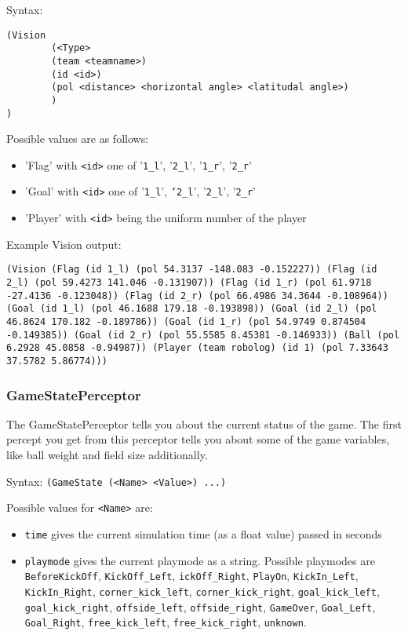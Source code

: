 Syntax: 
\begin{verbatim}
(Vision 
        (<Type> 
        (team <teamname>) 
        (id <id>) 
        (pol <distance> <horizontal angle> <latitudal angle>)
        )
)
\end{verbatim}

Possible values are as follows:

\begin{itemize}

\item 'Flag' with \texttt{<id>} one of '\texttt{1\_l}', '\texttt{2\_l}', '\texttt{1\_r}', '\texttt{2\_r}'
\item 'Goal' with \texttt{<id>} one of '\texttt{1\_l}', \texttt{'2\_l}', '\texttt{2\_l}', '\texttt{2\_r}'
\item 'Player' with \texttt{<id>} being the uniform number of the player

\end{itemize}

Example Vision output: 

\begin{verbatim}
(Vision (Flag (id 1_l) (pol 54.3137 -148.083 -0.152227)) (Flag (id
2_l) (pol 59.4273 141.046 -0.131907)) (Flag (id 1_r) (pol 61.9718
-27.4136 -0.123048)) (Flag (id 2_r) (pol 66.4986 34.3644 -0.108964))
(Goal (id 1_l) (pol 46.1688 179.18 -0.193898)) (Goal (id 2_l) (pol
46.8624 170.182 -0.189786)) (Goal (id 1_r) (pol 54.9749 0.874504
-0.149385)) (Goal (id 2_r) (pol 55.5585 8.45381 -0.146933)) (Ball (pol
6.2928 45.0858 -0.94987)) (Player (team robolog) (id 1) (pol 7.33643
37.5782 5.86774)))
\end{verbatim}

\subsubsection{GameStatePerceptor}

The GameStatePerceptor tells you about the current status of the game.
The first percept you get from this perceptor tells you about some of
the game variables, like ball weight and field size additionally.

Syntax: \texttt{(GameState (<Name> <Value>) ...)}

Possible values for \texttt{<Name>} are:

\begin{itemize}
  
\item \texttt{time} gives the current simulation time (as a float
  value) passed in seconds
  
\item \texttt{playmode} gives the current playmode as a string.
  Possible playmodes are \texttt{BeforeKickOff},
  \texttt{KickOff\_Left}, \texttt{ickOff\_Right}, \texttt{PlayOn},
  \texttt{KickIn\_Left}, \texttt{KickIn\_Right},
  \texttt{corner\_kick\_left}, \texttt{corner\_kick\_right},
  \texttt{goal\_kick\_left}, \texttt{goal\_kick\_right},
  \texttt{offside\_left}, \texttt{offside\_right}, \texttt{GameOver},
  \texttt{Goal\_Left}, \texttt{Goal\_Right}, \texttt{free\_kick\_left},
  \texttt{free\_kick\_right}, \texttt{unknown}.
\end{itemize}

